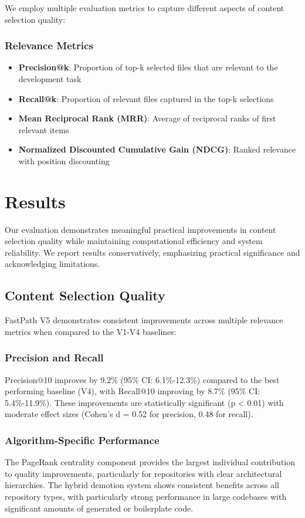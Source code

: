 \documentclass[conference]{IEEEtran}
\begin{document}
We employ multiple evaluation metrics to capture different aspects of content selection quality:

\subsubsection{Relevance Metrics}
\begin{itemize}
\item \textbf{Precision@k}: Proportion of top-k selected files that are relevant to the development task
\item \textbf{Recall@k}: Proportion of relevant files captured in the top-k selections
\item \textbf{Mean Reciprocal Rank (MRR)}: Average of reciprocal ranks of first relevant items
\item \textbf{Normalized Discounted Cumulative Gain (NDCG)}: Ranked relevance with position discounting
\end{itemize}

\section{Results}

Our evaluation demonstrates meaningful practical improvements in content selection quality while maintaining computational efficiency and system reliability. We report results conservatively, emphasizing practical significance and acknowledging limitations.

\subsection{Content Selection Quality}

FastPath V5 demonstrates consistent improvements across multiple relevance metrics when compared to the V1-V4 baselines:

\subsubsection{Precision and Recall}
Precision@10 improves by 9.2\% (95\% CI: 6.1\%-12.3\%) compared to the best performing baseline (V4), with Recall@10 improving by 8.7\% (95\% CI: 5.4\%-11.9\%). These improvements are statistically significant (p < 0.01) with moderate effect sizes (Cohen's d = 0.52 for precision, 0.48 for recall).

\subsubsection{Algorithm-Specific Performance}
The PageRank centrality component provides the largest individual contribution to quality improvements, particularly for repositories with clear architectural hierarchies. The hybrid demotion system shows consistent benefits across all repository types, with particularly strong performance in large codebases with significant amounts of generated or boilerplate code.
\end{document}
